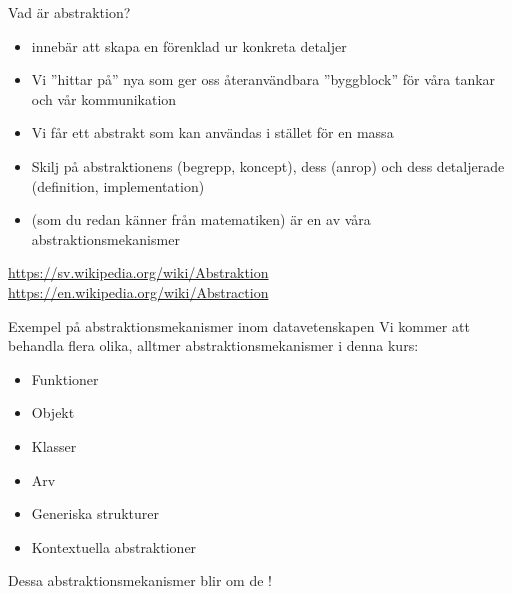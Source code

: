 





\begin{Slide}{Vad är abstraktion?}
\begin{itemize}
  \item {} innebär att skapa en förenklad  ur konkreta detaljer 
  \item Vi ''hittar på'' nya  som ger oss återanvändbara ''byggblock'' för våra tankar och vår kommunikation
  \item Vi får ett abstrakt  som kan användas i stället för en massa 
  \item Skilj på abstraktionens  (begrepp, koncept), dess  (anrop) och dess detaljerade  (definition, implementation)
  \item {} (som du redan känner från matematiken) är en av våra  abstraktionsmekanismer
\end{itemize}
\url{https://sv.wikipedia.org/wiki/Abstraktion}
\url{https://en.wikipedia.org/wiki/Abstraction}
\end{Slide}

\begin{Slide}{Exempel på abstraktionsmekanismer inom datavetenskapen}
Vi kommer att behandla flera olika, alltmer  abstraktionsmekanismer i denna kurs:
\begin{itemize}
  \item Funktioner
  \item Objekt
  \item Klasser
  \item Arv
  \item Generiska strukturer
  \item Kontextuella abstraktioner
\end{itemize}
Dessa abstraktionsmekanismer blir  om de ! 
\end{Slide}

